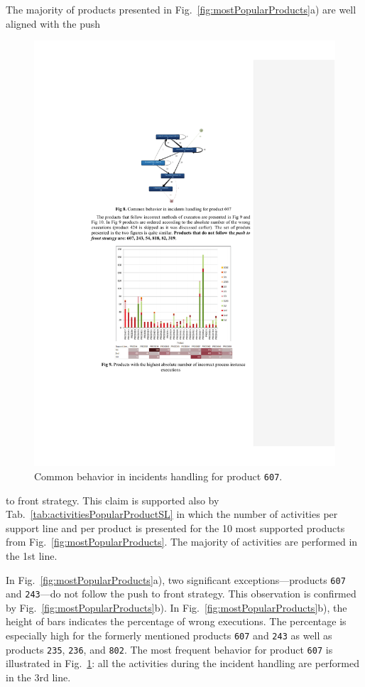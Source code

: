 \documentclass[lnbip]{svmultln}
\begin{document}
\newpage
The majority of products presented in Fig.~\ref{fig:mostPopularProducts}a) are well aligned with the push
\begin{figure}
  \vspace{-18pt}
  \begin{center}
		\includegraphics[width=.5\textwidth]{"figs/pic 10"}
  \end{center}
		\caption{Common behavior in incidents handling for product \texttt{607}.}
		\label{fig:incidentHandlingProduct607}
  \vspace{-20pt}
\end{figure}
to front strategy. This claim is supported also by Tab.~\ref{tab:activitiesPopularProductSL} in which the number of activities per support line  and per product is presented for the 10 most supported products from Fig.~\ref{fig:mostPopularProducts}. The majority of activities are performed in the 1st line.

In Fig.~\ref{fig:mostPopularProducts}a), two significant excep\-tions---products \texttt{607} and \texttt{243}---do not follow the push to front strategy. This observation is confirmed by Fig.~\ref{fig:mostPopularProducts}b). In Fig.~\ref{fig:mostPopularProducts}b), the height of bars indicates the percentage of wrong executions. The percentage is especially high for the formerly mentioned products \texttt{607} and \texttt{243} as well as products \texttt{235}, \texttt{236}, and \texttt{802}. The most frequent behavior for product \texttt{607} is illustrated in Fig.~\ref{fig:incidentHandlingProduct607}: all the activities during the incident handling are performed in the 3rd line.
% 
\end{document}
